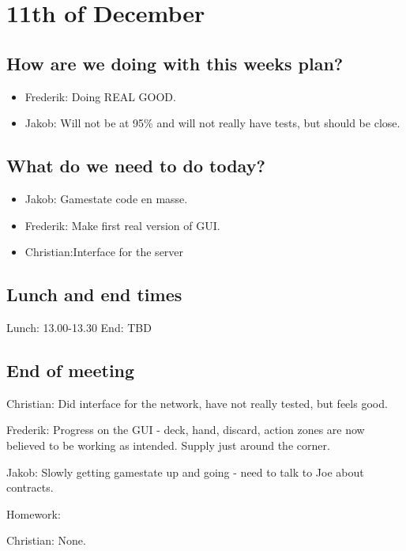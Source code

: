 \section{11th of December}
\subsection{How are we doing with this weeks plan?}
\begin{itemize}
\item Frederik: Doing REAL GOOD.
\item Jakob: Will not be at 95\% and will not really have tests, but should be close.
\end{itemize}

\subsection{What do we need to do today?}
\begin{itemize}
\item Jakob: Gamestate code en masse.
\item Frederik: Make first real version of GUI.
\item Christian:Interface for the server
\end{itemize}

\subsection{Lunch and end times}
Lunch:
13.00-13.30
End:
TBD
\subsection{End of meeting}
Christian: Did interface for the network, have not really tested, but feels good.

Frederik: Progress on the GUI - deck, hand, discard, action zones are now believed to be working as intended. Supply just around the corner.

Jakob: Slowly getting gamestate up and going - need to talk to Joe about contracts.

Homework: 

Christian: None.

